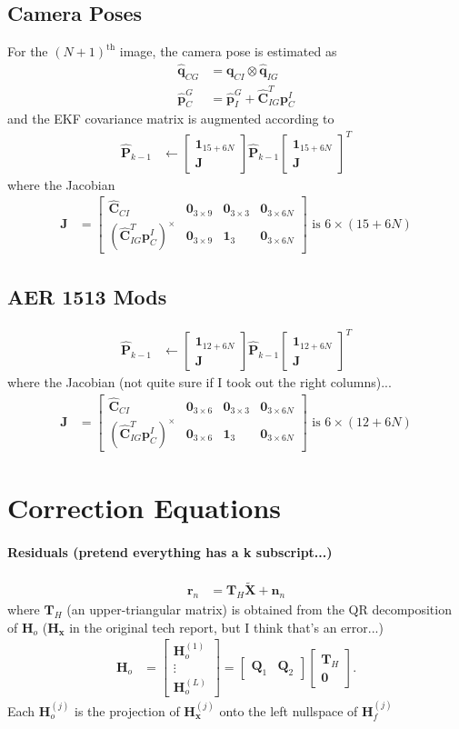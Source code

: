\documentclass[10pt,letterpaper,fleqn,oneside]{article}
\newcommand{\nl}{\\[0.5em]}
\def\Vec#1{\mathbf{#1}} %
\newcommand{\bbm}{\begin{bmatrix}}
\newcommand{\ebm}{\end{bmatrix}}
\begin{document}
\subsection{Camera Poses}
For the $\left(N+1\right)^{\text{th}}$ image, the camera pose is estimated as
\begin{align}
\hat{\Vec{q}}_{C G} &= \left.\Vec{q}_{C I}\right.\otimes\left.\hat{\Vec{q}}_{I G}\right. \nl
\hat{\Vec{p}}^G_C &= \left.\hat{\Vec{p}}^G_I\right. + \hat{\Vec{C}}_{I G}^T \left.\Vec{p}^I_C\right.
\end{align}
and the EKF covariance matrix is augmented according to
\begin{align}
\hat{\Vec{P}}_{k-1} &\leftarrow \bbm \Vec{1}_{15+6N}  \nl \Vec{J}\ebm \hat{\Vec{P}}_{k-1} \bbm \Vec{1}_{15+6N}  \nl \Vec{J}\ebm^T
\end{align}
where the Jacobian
\begin{align}
\Vec{J} &= \bbm \hat{\Vec{C}}_{C I} & \Vec{0}_{3\times9} & \Vec{0}_{3\times3} & \Vec{0}_{3\times6N} \nl
							\left(\hat{\Vec{C}}_{I G}^T \left.\Vec{p}^I_C\right.\right)^\times & \Vec{0}_{3\times9} & \Vec{1}_3 & \Vec{0}_{3\times6N}
				\ebm \text{ is } 6\times\left(15 + 6N\right)
\end{align}

\subsection{AER 1513 Mods}
\begin{align}
\hat{\Vec{P}}_{k-1} &\leftarrow \bbm \Vec{1}_{12+6N}  \nl \Vec{J}\ebm \hat{\Vec{P}}_{k-1} \bbm \Vec{1}_{12+6N}  \nl \Vec{J}\ebm^T
\end{align}
where the Jacobian (not quite sure if I took out the right columns)...
\begin{align}
\Vec{J} &= \bbm \hat{\Vec{C}}_{C I} & \Vec{0}_{3\times6} & \Vec{0}_{3\times3} & \Vec{0}_{3\times6N} \nl
							\left(\hat{\Vec{C}}_{I G}^T \left.\Vec{p}^I_C\right.\right)^\times & \Vec{0}_{3\times6} & \Vec{1}_3 & \Vec{0}_{3\times6N}
				\ebm \text{ is } 6\times\left(12 + 6N\right)
\end{align}


\section{Correction Equations}
\paragraph{Residuals (pretend everything has a k subscript...)}
\begin{align}
	\Vec{r}_n &= \Vec{T}_H \widetilde{\Vec{X}} + \Vec{n}_n
\end{align}
where $\Vec{T}_H$ (an upper-triangular matrix) is obtained from the QR decomposition of $\Vec{H}_o$ ($\Vec{H}_\Vec{x}$ in the original tech report, but I think that's an error...)
\begin{align}
\Vec{H}_o &= \bbm	\Vec{H}^{(1)}_o \nl \vdots \nl \Vec{H}^{(L)}_o \ebm
 = \bbm \Vec{Q}_1 & \Vec{Q}_2 \ebm \bbm \Vec{T}_H \nl \Vec{0} \ebm.
\end{align}
Each $\Vec{H}^{(j)}_o$ is the projection of $\Vec{H}^{(j)}_\Vec{x}$ onto the left nullspace of $\Vec{H}^{(j)}_f$
\end{document}
